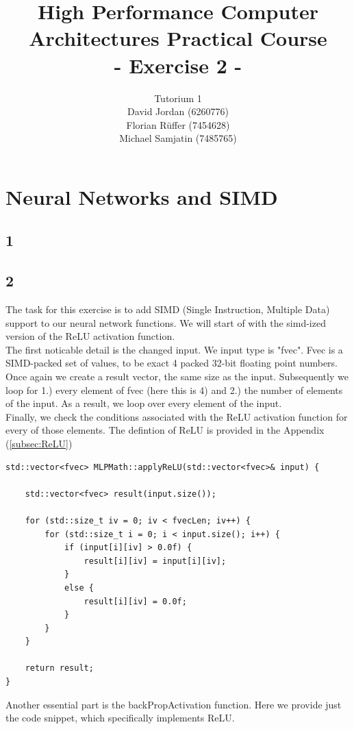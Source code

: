 \documentclass{article}
\title{\textbf{High Performance Computer Architectures Practical Course \\ - Exercise 2 -} \\[10mm]}
\author{Tutorium 1 \\[10mm] David Jordan (6260776) \\[1mm] Florian Rüffer (7454628) \\[1mm] Michael Samjatin (7485765) \\[10mm]}
\begin{document}
\maketitle
\newpage
\section{Neural Networks and SIMD}
\subsection*{1}
\subsection*{2}
The task for this exercise is to add SIMD (Single Instruction, Multiple Data) support to our neural network functions.
We will start of with the simd-ized version of the ReLU activation function. \\

\noindent The first noticable detail is the changed input. We input type is "fvec".
Fvec is a SIMD-packed set of values, to be exact 4 packed 32-bit floating point numbers.
Once again we create a result vector, the same size as the input. Subsequently we loop for 1.) every element of fvec (here this is 4) and 2.)
the number of elements of the input. As a result, we loop over every element of the input. \\

\noindent Finally, we check the conditions associated with the ReLU activation function for every of those elements.
The defintion of ReLU is provided in the Appendix (\hyperref[subsec:ReLU]{{\ref*{subsec:ReLU}}})


\begin{lstlisting}[caption=SIMD-ized ReLU]
    std::vector<fvec> MLPMath::applyReLU(std::vector<fvec>& input) {

    std::vector<fvec> result(input.size());

    for (std::size_t iv = 0; iv < fvecLen; iv++) {
        for (std::size_t i = 0; i < input.size(); i++) {
            if (input[i][iv] > 0.0f) {
                result[i][iv] = input[i][iv];
            }
            else {
                result[i][iv] = 0.0f;
            }
        }
    }
    
    return result;
}
\end{lstlisting}

\newpage
\noindent Another essential part is the backPropActivation function.
Here we provide just the code snippet, which specifically implements ReLU. \\
\end{document}
